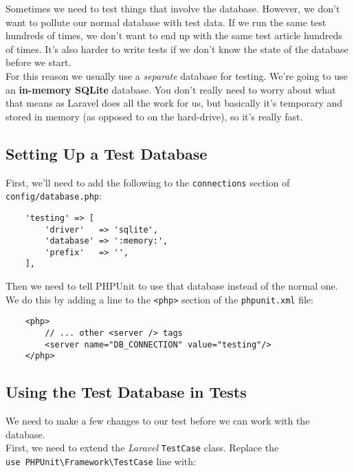 Sometimes we need to test things that involve the database. However, we don't want to pollute our normal database with test data. If we run the same test hundreds of times, we don't want to end up with the same test article hundreds of times. It's also harder to write tests if we don't know the state of the database before we start.
\\

For this reason we usually use a \textit{separate} database for testing. We're going to use an \textbf{in-memory SQLite} database. You don't really need to worry about what that means as Laravel does all the work for us, but basically it's temporary and stored in memory (as opposed to on the hard-drive), so it's really fast.


\pagebreak


\subsection{Setting Up a Test Database}

First, we'll need to add the following to the \texttt{connections} section of \\ \texttt{config/database.php}:

\begin{verbatim}
    'testing' => [
        'driver'   => 'sqlite',
        'database' => ':memory:',
        'prefix'   => '',
    ],
\end{verbatim}

Then we need to tell PHPUnit to use that database instead of the normal one. We do this by adding a line to the \texttt{<php>} section of the \texttt{phpunit.xml} file:

\begin{verbatim}
    <php>
        // ... other <server /> tags
        <server name="DB_CONNECTION" value="testing"/>
    </php>
\end{verbatim}


\subsection{Using the Test Database in Tests}

We need to make a few changes to our test before we can work with the database.
\\

First, we need to extend the \textit{Laravel} \texttt{TestCase} class. Replace the \\ \texttt{use PHPUnit\textbackslash{}Framework\textbackslash{}TestCase} line with:

